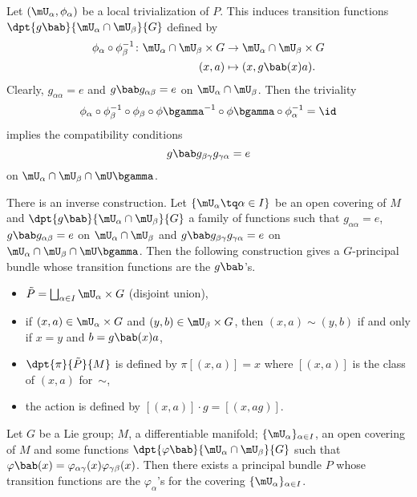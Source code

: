 Let $(\mU_{\alpha},\phi_{\alpha})$ be a local trivialization of $P$. This induces transition functions $\dpt{g\bab}{\mU_{\alpha}\cap\mU_{\beta}}{G}$ defined by
\begin{equation}
	\begin{aligned}
		\phi_{\alpha}\circ\phi_{\beta}^{-1}\colon \mU_{\alpha}\cap\mU_{\beta}\times G & \to \mU_{\alpha}\cap\mU_{\beta}\times G       \\
		(x,a)                                                                         & \mapsto (x,g\bab(x)a).\label{eq:transi_princ}
	\end{aligned}
\end{equation}
Clearly, $g_{\alpha\alpha}=e$ and $g\bab g_{\alpha\beta}=e$ on $\mU_{\alpha}\cap\mU_{\beta}$. Then the triviality
\[
	\phi_{\alpha}\circ\phi_{\beta}^{-1}\circ\phi_{\beta}\circ\phi\bgamma^{-1}\circ\phi\bgamma\circ\phi_{\alpha}^{-1}=\id
\]
implies the compatibility conditions
\begin{equation}
	g\bab g_{\beta\gamma} g_{\gamma\alpha}=e
\end{equation}
on $\mU_{\alpha}\cap\mU_{\beta}\cap\mU\bgamma$.

There is an inverse construction. Let $\{\mU_{\alpha}\tq\alpha\in I\}$ be an open covering of $M$ and $\dpt{g\bab}{\mU_{\alpha}\cap\mU_{\beta}}{G}$ a family of functions such that $g_{\alpha\alpha}=e$, $g\bab g_{\alpha\beta}=e$ on $\mU_{\alpha}\cap\mU_{\beta}$ and $g\bab g_{\beta\gamma}g_{\gamma\alpha}=e$ on $\mU_{\alpha}\cap\mU_{\beta}\cap\mU\bgamma$. Then the following construction gives a $G$-principal bundle whose transition functions are the $g\bab$'s.

\begin{itemize}
	\item $\tilde{P}=\bigsqcup_{\alpha\in I}\mU_{\alpha}\times G$  (disjoint union),
	\item if $(x,a)\in\mU_{\alpha}\times G$ and $(y,b)\in\mU_{\beta}\times G$, then $(x,a)\sim(y,b)$ if and only if $x=y$ and $b=g\bab(x)a$,
	\item $\dpt{\pi}{\tilde{P}}{M}$ is defined by $\pi[(x,a)]=x$ where $[(x,a)]$ is the class of $(x,a)$ for~$\sim$,
	\item the action is defined by $[(x,a)]\cdot g=[(x,ag)]$.
\end{itemize}

\begin{theorem}
	Let $G$ be a Lie group; $M$, a differentiable manifold; $\{\mU_{\alpha}\}_{\alpha\in I}$, an open covering of $M$ and some functions $\dpt{\varphi\bab}{\mU_{\alpha}\cap\mU_{\beta}}{G}$ such that $\varphi\bab(x)=\varphi_{\alpha\gamma}(x)\varphi_{\gamma\beta}(x)$. Then there exists a principal bundle $P$ whose transition functions are the $\varphi_{\alpha}$'s for the covering $\{\mU_{\alpha}\}_{\alpha\in I}$.
\end{theorem}

